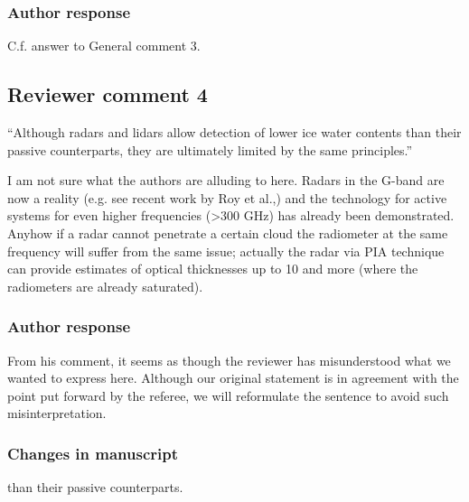 \begin{description}
\subsubsection*{Author response}

 C.f. answer to General comment 3.


\subsection*{Reviewer comment 4}

``Although radars and lidars allow detection of lower ice water contents than
their passive counterparts, they are ultimately limited by the same
principles.''

I am not sure what the authors are alluding to here. Radars in the
G-band are now a reality (e.g. see recent work by Roy et al.,) and the
technology for active systems for even higher frequencies (>300 GHz) has already
been demonstrated. Anyhow if a radar cannot penetrate a certain cloud the
radiometer at the same frequency will suffer from the same issue; actually the
radar via PIA technique can provide estimates of optical thicknesses up to 10
and more (where the radiometers are already saturated).

\subsubsection*{Author response}

From his comment, it seems as though the reviewer has misunderstood what we
wanted to express here. Although our original statement is in agreement with the
point put forward by the referee, we will reformulate the sentence to avoid such
misinterpretation.

\subsubsection*{Changes in manuscript}

\begin{change}[38]
\DIFaddend than their passive
counterparts\DIFdelbegin {}\DIFdelend \DIFaddbegin {}\DIFaddend .
\end{change}


\end{description}
